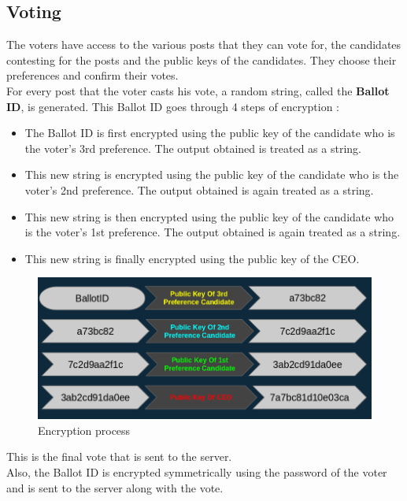 \documentclass[twoside,twocolumn]{article}
\newcommand\tab[1][1cm]{\hspace*{#1}}
\begin{document}
\subsection{Voting}
    \tab The voters have access to the various posts that they can vote for, the candidates contesting for the posts and the public keys of the candidates. They choose their preferences and confirm their votes.\\
    \tab For every post that the voter casts his vote, a random string, called the \textbf{Ballot ID}, is generated. This Ballot ID goes through 4 steps of encryption :
    \begin{itemize}
        \item The Ballot ID is first encrypted using the public key of the candidate who is the voter's 3rd preference. The output obtained is treated as a string.
        \item This new string is encrypted using the public key of the candidate who is the voter's 2nd preference. The output obtained is again treated as a string.
        \item This new string is then encrypted using the public key of the candidate who is the voter's 1st preference. The output obtained is again treated as a string.
        \item This new string is finally encrypted using the public key of the CEO.
    \end{itemize}
    \begin{figure}[h!]
        \includegraphics[width=\linewidth]{encryption.png}
        \caption{Encryption process}
        \label{fig:boat1}
    \end{figure}
    \tab This is the final vote that is sent to the server.\\
    \tab Also, the Ballot ID is encrypted symmetrically using the password of the voter and is sent to the server along with the vote.\\
\end{document}
